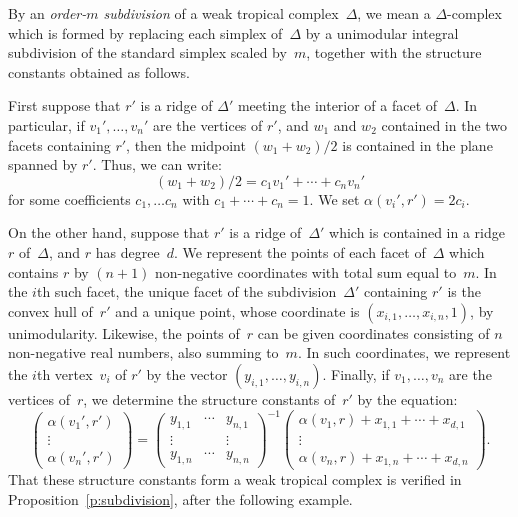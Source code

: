 \documentclass[11pt]{amsart}
\theoremstyle{definition}
\newcommand{\defi}[1]{\emph{#1}}
\begin{document}
\begin{const}[Subdivisions]\label{const:subdivision}
By an \defi{order-$m$ subdivision} of a weak tropical complex~$\Delta$, we mean
a $\Delta$-complex which is formed by replacing each simplex of~$\Delta$ by a
unimodular integral subdivision of the standard simplex scaled by~$m$, together
with the structure constants obtained as follows.

First suppose that $r'$ is a ridge of $\Delta'$ meeting the interior of a
facet of~$\Delta$.
In particular, if $v_1', \ldots, v_n'$
are the vertices of $r'$, and $w_1$ and $w_2$ contained in the two facets
containing $r'$, then the midpoint $(w_1 + w_2) / 2$ is contained in the plane
spanned by $r'$. Thus, we can write:
\begin{equation*}
(w_1 + w_2) / 2 = c_1 v_1' + \cdots + c_n v_n'
\end{equation*}
for some coefficients $c_1, \ldots c_n$ with $c_1 + \cdots + c_n = 1$. We set
$\alpha(v_i', r') = 2 c_i$.

On the other hand, suppose that $r'$ is a ridge of~$\Delta'$ which is contained
in a ridge~$r$ of~$\Delta$, and $r$ has degree~$d$. We represent the points of
each facet of~$\Delta$ which contains $r$ by $(n+1)$ non-negative coordinates
with total sum equal to~$m$. In the $i$th such facet, the unique facet of the
subdivision~$\Delta'$ containing $r'$ is the convex hull of~$r'$ and a unique
point, whose coordinate is $(x_{i,1}, \ldots, x_{i,n}, 1)$, by unimodularity.
Likewise, the points of~$r$ can be given coordinates consisting of $n$
non-negative  real numbers, also summing to~$m$. In such coordinates, we
represent the $i$th vertex~$v_i$ of $r'$ by the vector $(y_{i,1}, \ldots,
y_{i,n})$. Finally, if $v_1, \ldots, v_n$ are the vertices of~$r$, we determine
the structure constants of~$r'$ by the equation:
\begin{equation}\label{eq:subdivision}
\begin{pmatrix}
\alpha(v_1', r') \\ \vdots \\ \alpha(v_n', r')
\end{pmatrix}
= \begin{pmatrix}
y_{1,1} & \cdots & y_{n, 1} \\
\vdots & & \vdots \\
y_{1,n} & \cdots & y_{n,n}
\end{pmatrix}^{-1} \!
\begin{pmatrix}
\alpha(v_1, r) + x_{1,1} + \cdots + x_{d,1} \\
\vdots \\
\alpha(v_n, r) + x_{1, n} + \cdots + x_{d,n}
\end{pmatrix}\!.
\end{equation}
That these structure constants form a weak tropical complex is
verified in Proposition~\ref{p:subdivision}, after the following example.
\end{const}
\end{document}
